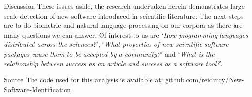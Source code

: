 \documentclass[final]{beamer}
\newlength{\sepwid}
\newlength{\onecolwid}
\begin{document}
\begin{frame}{}
\begin{columns}[t]
\begin{column}{\onecolwid}
\begin{alertblock}{Discussion}
	These issues aside, the research undertaken herein demonstrates large-scale detection of new software introduced in scientific literature. The next steps are to do biometric and natural language processing on our corpora as there are many questions we can answer. Of interest to us are `\textit{How programming languages distributed across the sciences?}', `\textit{What properties of new scientific software packages cause them to be accepted by a community?}' and `\textit{What is the relationship between success as an article and success as a software tool?}'.

\end{alertblock}
\begin{alertblock}{Source}
	 The code used for this analysis is available at: \href{https://github.com/reidmcy/New-Software-Identification}{github.com/reidmcy/New-Software-Identification}
\end{alertblock}
\end{column} %
\end{columns}

\end{frame}
\end{document}
